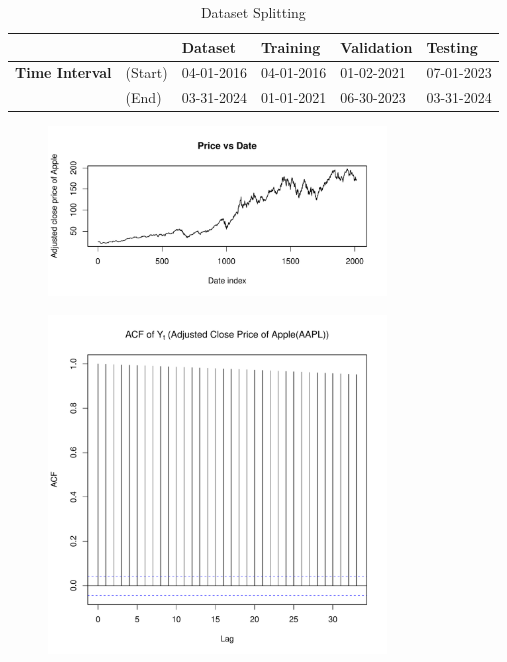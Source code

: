 \documentclass[conference,onecolumn,11pt]{IEEEtran}
\begin{document}
\begin{table}[htbp]
    \centering
    \caption{Dataset Splitting}
    \begin{tabular}{@{}rlllll@{}}
        \toprule
         && \textbf{Dataset} & \textbf{Training} & \textbf{Validation} & \textbf{Testing} \\
        \midrule
        \textbf{Time Interval} &(Start) & 04-01-2016 & 04-01-2016 & 01-02-2021 & 07-01-2023\\
        &(End)& 03-31-2024 & 01-01-2021 & 06-30-2023 & 03-31-2024\\
  
        \bottomrule
    \end{tabular}
    \label{tab:GFS}
\end{table}

\begin{figure}[htpb]
	\centering
	\includegraphics[width=0.8\textwidth]{pic/Price_vs_Date.pdf}
	\caption{}
	\label{fig:price}
\end{figure}

\begin{figure}[htpb]
	\centering
	\includegraphics[width=0.8\textwidth]{pic/ACF_AdjClosed.pdf}
	\caption{}
	\label{fig:acf1}
\end{figure}
\end{document}
